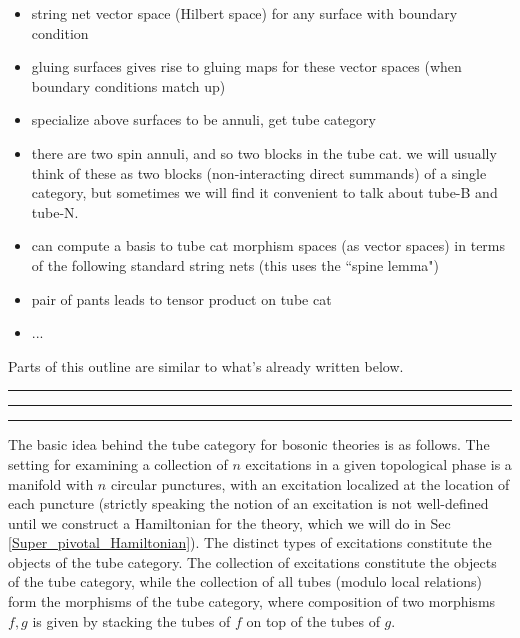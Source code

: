 \documentclass[12pt,a4paper]{article}
\newcommand{\mcc}{\mathcal{C}}
\newcommand{\ethan}[1]{{\color{amethyst}\footnotesize{(EL) #1}}}
\newcommand{\kwsep}{\bigskip\hrule\medskip\hrule\medskip\hrule\bigskip}
\begin{document}
\begin{itemize}
\item string net vector space (Hilbert space) for any surface with boundary condition
\item gluing surfaces gives rise to gluing maps for these vector spaces (when boundary conditions match up)
\item specialize above surfaces to be annuli, get tube category
\item there are two spin annuli, and so two blocks in the tube cat.  we will usually think of these as two
blocks (non-interacting direct summands) of a single category, but sometimes we will find it convenient to talk
about tube-B and tube-N.
\item can compute a basis to tube cat morphism spaces (as vector spaces) in terms of the following standard string nets
(this uses the ``spine lemma")
\item pair of pants leads to tensor product on tube cat

\item ...
\end{itemize}

Parts of this outline are similar to what's already written below.

\kwsep

The basic idea behind the tube category for bosonic theories is as follows. 
The setting for examining a collection of $n$ excitations in a given topological phase is a 
manifold with $n$ circular punctures, with an excitation localized at the location of each puncture (strictly speaking the notion of an excitation is not well-defined until we construct a Hamiltonian for the theory, which we will do in Sec \ref{Super_pivotal_Hamiltonian}). 
The distinct types of excitations constitute the objects of the tube category. 
The collection of excitations constitute the objects of the tube category, while the collection of all 
tubes (modulo local relations) form the morphisms of the tube category, where composition of two morphisms 
$f,g$ is given by stacking the tubes of $f$ on top of the tubes of $g$. 
\end{document}
